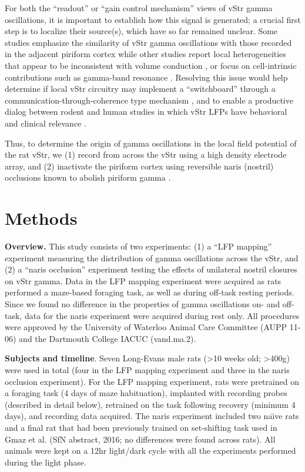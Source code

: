\documentclass[11pt]{article}
\let\cite=\citep
\begin{document}
For both the ``readout'' or ``gain control mechanism'' views of vStr
gamma oscillations, it is important to establish how this signal is
generated; a crucial first step is to localize their source(s), which
have so far remained unclear.  Some studies emphasize the similarity
of vStr gamma oscillations with those recorded in the adjacent
piriform cortex \cite{Berke2009b} while other studies report local
heterogeneities that appear to be inconsistent with volume conduction
\cite{Kalenscher2010,Morra2012}, or focus on cell-intrinsic
contributions such as gamma-band resonance
\cite{Taverna2007}. Resolving this issue would help determine if local
vStr circuitry may implement a ``switchboard'' through a
communication-through-coherence type mechanism
\cite{Fries2005a,Gruber2009,Akam2010}, and to enable a productive
dialog between rodent and human studies in which vStr LFPs have
behavioral and clinical relevance
\cite{Sturm2003,McCracken2009,Dejean2013}.

Thus, to determine the origin of gamma oscillations in the local field
potential of the rat vStr, we (1) record from across the vStr using a
high density electrode array, and (2) inactivate the piriform cortex
using reversible naris (nostril) occlusions known to abolish piriform
gamma \cite{Zibrowski1997}.


\section*{Methods}

{\bf Overview.} This study consists of two experiments: (1) a ``LFP
mapping'' experiment measuring the distribution of gamma oscillations
across the vStr, and (2) a ``naris occlusion'' experiment testing the
effects of unilateral nostril closures on vStr gamma. Data in the LFP
mapping experiment were acquired as rats performed a maze-based
foraging task, as well as during off-task resting periods. Since we
found no difference in the properties of gamma oscillations on- and
off-task, data for the naris experiment were acquired during rest
only. All procedures were approved by the University of Waterloo
Animal Care Committee (AUPP 11-06) and the Dartmouth College IACUC (vand.ma.2).

{\bf Subjects and timeline}. Seven Long-Evans male rats
(\textgreater10 weeks old; \textgreater400g) were used in total (four
in the LFP mapping experiment and three in the naris occlusion
experiment).  For the LFP mapping experiment, rats were pretrained on
a foraging task (4 days of maze habituation), implanted with recording
probes (described in detail below), retrained on the task following
recovery (minimum 4 days), and recording data acquired.  The naris
experiment included two na\"{\i}ve rats and a final rat that had been
previously trained on set-shifting task used in Gmaz et al. (SfN
abstract, 2016; no differences were found across rats). All animals
were kept on a 12hr light/dark cycle with all the experiments
performed during the light phase.
\end{document}
